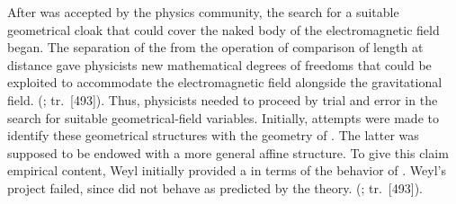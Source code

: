 \documentclass[draft]{article}
\newcommand{\phin}{\ensuremath{\varphi_\nu}\xspace}
\renewcommand{\rzlap}[2]{(\cite[#1]{Reichenbach1928}; tr.\ [#2])\xspace}
\begin{document}
After \gr was accepted by the physics community, the search for a suitable geometrical cloak that could cover the naked body of the electromagnetic field began. The separation of the  \Gtmn from the operation of comparison of length at distance \gmn gave physicists new mathematical degrees of freedoms that could be exploited to accommodate the electromagnetic field alongside the gravitational field.  \rzlap{354}{493}. Thus, physicists needed to proceed by trial and error in the search for suitable geometrical-field variables. Initially, attempts were made to identify these geometrical structures with  the geometry of \spti. The latter was supposed to be endowed with a more general affine structure. To give this claim empirical content, Weyl initially provided a  in terms of the behavior of \rac. Weyl's project failed, since \rac did not behave as predicted by the theory.   \rzlap{353}{493}.


\end{document}
